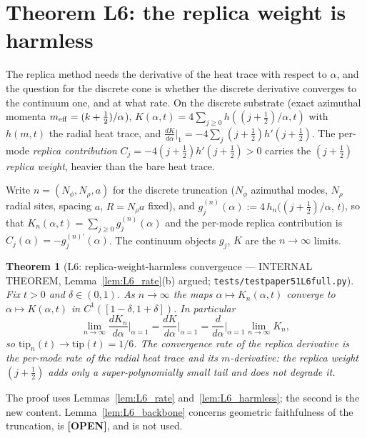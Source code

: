 \documentclass[11pt,a4paper]{article}
\theoremstyle{plain}
\newtheorem{theorem}{Theorem}[section]
\theoremstyle{definition}
\renewcommand{\_}{\textunderscore\allowbreak}
\begin{document}
\section{Theorem L6: the replica weight is harmless}
\label{sec:L6}

The replica method needs the derivative of the heat trace with respect
to $\alpha$, and the question for the discrete cone is whether the
discrete derivative converges to the continuum one, and at what rate.
On the discrete substrate (exact azimuthal momenta
$m_{\rm eff}=(k+\tfrac12)/\alpha$),
$K(\alpha,t)=4\sum_{j\ge0}h((j+\tfrac12)/\alpha,t)$ with $h(m,t)$ the radial
heat trace, and
$\frac{dK}{d\alpha}|_1 = -4\sum_j(j+\tfrac12)h'(j+\tfrac12)$. The per-mode
\emph{replica contribution} $C_j=-4(j+\tfrac12)h'(j+\tfrac12)>0$ carries the
$(j+\tfrac12)$ \emph{replica weight}, heavier than the bare heat trace.

Write $n=(N_\phi, N_\rho, a)$ for the discrete truncation ($N_\phi$ azimuthal
modes, $N_\rho$ radial sites, spacing $a$, $R=N_\rho a$ fixed), and
$g_j^{(n)}(\alpha) := 4\,h_n\!\big((j+\tfrac12)/\alpha,\,t\big)$, so that
$K_n(\alpha,t)=\sum_{j\ge0} g_j^{(n)}(\alpha)$ and the per-mode replica
contribution is $C_j(\alpha)=-g_j^{(n)\prime}(\alpha)$. The continuum objects
$g_j$, $K$ are the $n\to\infty$ limits.

\begin{theorem}[L6: replica-weight-harmless convergence --- INTERNAL
THEOREM, Lemma~\ref{lem:L6_rate}(b) argued; \texttt{tests/test\_paper51\_L6\_full.py}]
\label{thm:L6}
Fix $t>0$ and $\delta\in(0,1)$. As $n\to\infty$ the maps
$\alpha\mapsto K_n(\alpha,t)$ converge to $\alpha\mapsto K(\alpha,t)$ in
$C^1([1-\delta,1+\delta])$. In particular
\begin{equation}
\lim_{n\to\infty}\frac{dK_n}{d\alpha}\bigg|_{\alpha=1}
=\frac{dK}{d\alpha}\bigg|_{\alpha=1}
=\frac{d}{d\alpha}\bigg|_{\alpha=1}\lim_{n\to\infty}K_n,
\end{equation}
so $\mathrm{tip}_n(t) \to \mathrm{tip}(t) = 1/6$. The convergence rate of
the replica derivative is the per-mode rate of the radial heat trace and
its $m$-derivative: the replica weight $(j+\tfrac12)$ adds only a
super-polynomially small tail and does not degrade it.
\end{theorem}

The proof uses Lemmas~\ref{lem:L6_rate} and~\ref{lem:L6_harmless}; the
second is the new content. Lemma~\ref{lem:L6_backbone} concerns
geometric faithfulness of the truncation, is \textbf{[OPEN]}, and is not
used.
\end{document}
